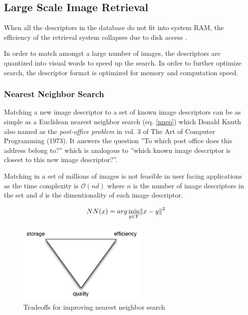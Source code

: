 \documentclass[english,12pt,a4paper,pdftex,elec,utf8]{aaltothesis}
\begin{document}


\subsection{Large Scale Image Retrieval}

When all the descriptors in the database do not fit into system RAM, the efficiency of the retrieval system collapses due to disk access \cite{Philbin2007}.

In order to match amongst a large number of images, the descriptors are quantized into visual words to speed up the search. In order to further optimize search, the descriptor format is optimized for memory and computation speed. \cite{Jegou2010}

\subsubsection{Nearest Neighbor Search}
Matching a new image descriptor to a set of known image descriptors can be as simple as a Euclidean nearest neighbor search (eq. \ref{nneq}) which Donald Knuth also named as the \emph{post-office problem} in vol. 3 of The Art of Computer Programming (1973). It answers the question ''To which post office does this address belong to?'' which is analogous to ''which known image descriptor is closest to this new image descriptor?''.

Matching in a set of millions of images is not feasible in user facing applications as the time complexity is $\mathcal{O}(nd)$ where $n$ is the number of image descriptors in the set and $d$ is the dimentionality of each image descriptor.


\begin{equation}
\label{nneq}
NN(x) = arg \min_{y\in Y}\norm{x-y}^2
\end{equation}

\begin{figure}[htb]
\begin{center}
\includegraphics[height=4cm]{figures/nntradeoffs}
\end{center}
\caption{Tradeoffs for improving nearest neighbor search}
\label{nntradeoffs}
\end{figure}
\end{document}
